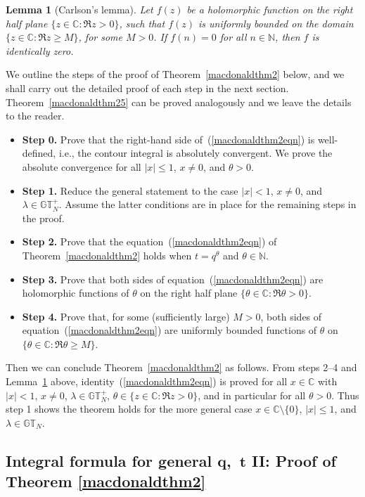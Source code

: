 \documentclass[pdftex]{sigma}
\numberwithin{equation}{section}
\newtheorem{lem}[thm]{Lemma}
\newcommand{\C}{\mathbb{C}}
\newcommand{\N}{\mathbb{N}}
\newcommand{\GT}{\mathbb{GT}}
\newcommand{\GTp}{\mathbb{GT}^+}
\begin{document}
\begin{lem}[Carlson's lemma]\label{carlsonlemma}
Let $f(z)$ be a holomorphic function on the right half plane $\{z\in\C\colon \Re z > 0\}$, such that $f(z)$ is uniformly bounded on the domain $\{z\in\C \colon \Re z \geq M\}$, for some $M>0$. If $f(n) = 0$ for all $n\in\N$, then $f$ is identically zero.
\end{lem}

We outline the steps of the proof of Theorem~\ref{macdonaldthm2} below, and we shall carry out the detailed proof of each step in the next section. Theorem~\ref{macdonaldthm25} can be proved analogously and we leave the details to the reader.
\begin{itemize}\itemsep=0pt
	\item \textbf{Step 0.} Prove that the right-hand side of~(\ref{macdonaldthm2eqn}) is well-def\/ined, i.e., the contour integral is absolutely convergent. We prove the absolute convergence for all $|x|\leq 1$, $x\neq 0$, and $\theta>0$.
	\item \textbf{Step 1.} Reduce the general statement to the case $|x| < 1$, $x\neq 0$, and $\lambda\in\GTp_N$. Assume the latter conditions are in place for the remaining steps in the proof.
	\item \textbf{Step 2.} Prove that the equation~(\ref{macdonaldthm2eqn}) of Theorem~\ref{macdonaldthm2} holds when $t = q^{\theta}$ and $\theta\in\N$.
	\item \textbf{Step 3.} Prove that both sides of equation~(\ref{macdonaldthm2eqn}) are holomorphic functions of $\theta$ on the right half plane $\{\theta\in\C\colon \Re\theta > 0\}$.
	\item \textbf{Step 4.} Prove that, for some (suf\/f\/iciently large) $M > 0$, both sides of equation~(\ref{macdonaldthm2eqn}) are uniformly bounded functions of $\theta$ on $\{\theta\in\C\colon \Re\theta \geq M\}$.
\end{itemize}

Then we can conclude Theorem~\ref{macdonaldthm2} as follows. From steps 2--4 and Lemma~\ref{carlsonlemma} above, identity~(\ref{macdonaldthm2eqn}) is proved for all $x\in\C$ with $|x| < 1$, $x\neq 0$, $\lambda\in\GTp_N$, $\theta\in\{z\in\C \colon \Re z > 0\}$, and in particular for all $\theta > 0$. Thus step 1 shows the theorem holds for the more general case $x\in\C \setminus \{0\}$, $|x|\leq 1$, and $\lambda\in\GT_N$.


\subsection[Integral formula for general $q$,~$t$ II: Proof of Theorem \ref{macdonaldthm2}]{Integral formula for general $\boldsymbol{q}$,~$\boldsymbol{t}$ II: Proof of Theorem \ref{macdonaldthm2}}
\end{document}
